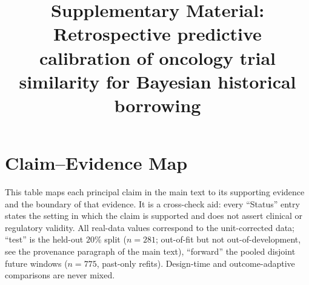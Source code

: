 \documentclass[11pt]{article}
\title{Supplementary Material:\\
Retrospective predictive calibration of oncology trial similarity
for Bayesian historical borrowing}
\author{}
\date{}
\begin{document}
\maketitle

\renewcommand{\thesection}{S\arabic{section}}
\renewcommand{\thetable}{S\arabic{table}}
\renewcommand{\thefigure}{S\arabic{figure}}

\section{Claim--Evidence Map}

This table maps each principal claim in the main text to its supporting
evidence and the boundary of that evidence. It is a cross-check aid: every
``Status'' entry states the setting in which the claim is supported and does
not assert clinical or regulatory validity. All real-data values correspond to
the unit-corrected data; ``test'' is the held-out $20\%$ split ($n=281$;
out-of-fit but not out-of-development, see the provenance paragraph of the
main text), ``forward'' the pooled disjoint future windows ($n=775$,
past-only refits). Design-time and outcome-adaptive comparisons are never
mixed.
\end{document}
